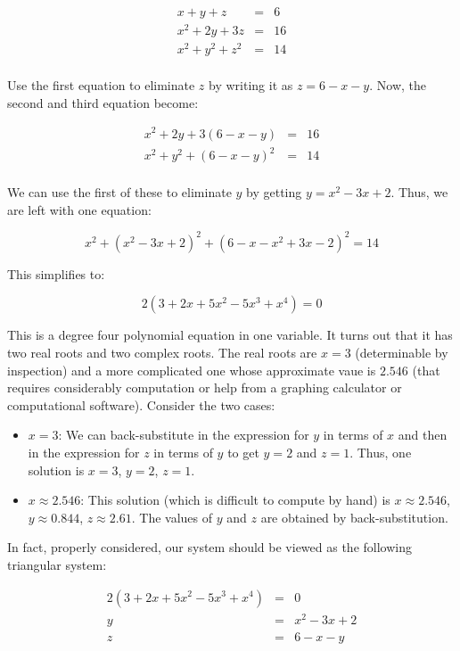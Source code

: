 \documentclass[10pt]{amsart}
\begin{document}
\begin{eqnarray*}
  x + y + z & = & 6\\
  x^2 + 2y + 3z & = & 16\\
  x^2 + y^2 + z^2 & = & 14\\
\end{eqnarray*}

Use the first equation to eliminate $z$ by writing it as $z = 6 - x -
y$. Now, the second and third equation become:

\begin{eqnarray*}
  x^2 + 2y + 3(6 - x - y) & = & 16\\
  x^2 + y^2 + (6 - x - y)^2& = & 14\\
\end{eqnarray*}

We can use the first of these to eliminate $y$ by getting $y = x^2 -
3x + 2$. Thus, we are left with one equation:

$$x^2 + (x^2 - 3x + 2)^2 + (6 - x - x^2 + 3x - 2)^2 = 14$$

This simplifies to:

$$2(3 + 2 x + 5 x^2 - 5 x^3 + x^4) = 0$$

This is a degree four polynomial equation in one variable. It turns
out that it has two real roots and two complex roots. The real roots
are $x = 3$ (determinable by inspection) and a more complicated one
whose approximate vaue is $2.546$ (that requires considerably
computation or help from a graphing calculator or computational
software). Consider the two cases:

\begin{itemize}
\item $x = 3$: We can back-substitute in the expression for $y$ in
  terms of $x$ and then in the expression for $z$ in terms of $y$ to
  get $y = 2$ and $z = 1$. Thus, one solution is $x = 3$, $y = 2$, $z
  = 1$. 
\item $x \approx 2.546$: This solution (which is difficult to compute
  by hand) is $x \approx 2.546$, $y \approx 0.844$, $z \approx 2.61$. The
  values of $y$ and $z$ are obtained by back-substitution.
\end{itemize}

In fact, properly considered, our system should be viewed as the
following triangular system:

\begin{eqnarray*}
  2(3 + 2 x + 5 x^2 - 5 x^3 + x^4) & = & 0\\
  y & = & x^2 - 3x + 2 \\
  z & = & 6 - x - y \\
\end{eqnarray*}
\end{document}
